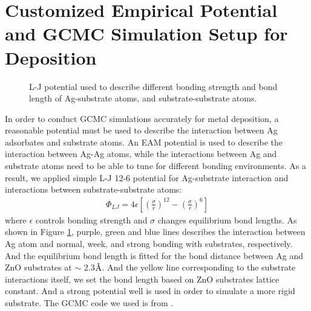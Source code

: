 \section{Customized Empirical Potential and GCMC Simulation Setup for Deposition}

\begingroup
\begin{figure}[!ht]
  \centering
  \caption[Lennard-Jones potential used to describe different bonding strength and bond length of Ag-substrate atoms, and substrate-substrate atoms]{\ac{L-J} potential used to describe different bonding strength and bond length of Ag-substrate atoms, and substrate-substrate atoms.}
  \label{Chap:Ag/ZnO:fig2}
\end{figure}
\endgroup

In order to conduct \ac{GCMC} simulations accurately for metal deposition, a reasonable potential must be used to describe the interaction between Ag adsorbates and substrate atoms. An \ac{EAM} potential \cite{williams2016modeling} is used to describe the interaction between Ag-Ag atoms, while the interactions between Ag and substrate atoms need to be able to tune for different bonding environments. As a result, we applied simple \ac{L-J} 12-6 potential \cite{jones1924determination} for Ag-substrate interaction and interactions between substrate-substrate atoms:
\begin{align}
 \Phi_{LJ} = 4\epsilon \left[ (\frac{\sigma}{r})^{12} - (\frac{\sigma}{r})^6\right]
 \label{Chap:Ag/ZnO:eq:LJ}
\end{align}
where $\epsilon$ controls bonding strength and $\sigma$ changes equilibrium bond lengths. As shown in Figure \ref{Chap:Ag/ZnO:fig2}, purple, green and blue lines describes the interaction between Ag atom and normal, week, and strong bonding with substrates, respectively. And the equilibrium bond length is fitted for the bond distance between Ag and ZnO substrates at $\sim$ 2.3$\mbox{\normalfont\AA}$. And the yellow line corresponding to the substrate interactions itself, we set the bond length based on ZnO substrates lattice constant. And a strong potential well is used in order to simulate a more rigid substrate. The \ac{GCMC} code we used is from \cite{sina2017mapp}.


